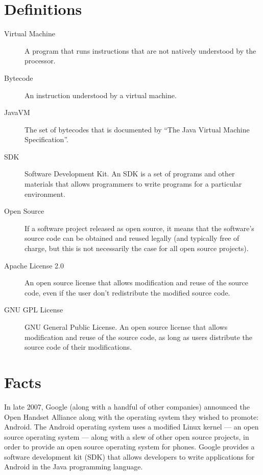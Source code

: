 \documentclass[11pt]{article}
\begin{document}
\newpage

\begin{multicols}{2}
\setcounter{page}{1}

\section{Definitions} %
\label{sec:defs}

\begin{description}
    \item[Virtual Machine] A program that runs instructions that are not
    natively understood by the processor.
    \item[Bytecode] An instruction understood by a virtual machine.
    \item[JavaVM] The set of bytecodes that is documented by ``The Java Virtual
    Machine Specification''. \cite{javavm-bytecode}
    \item[SDK] Software Development Kit.  An SDK is a set of programs and other
    materials that allows programmers to write programs for a particular
    environment.
    \item[Open Source] If a software project released as open source, it means
    that the software's source code can be obtained and reused legally (and
    typically free of charge, but this is not necessarily the case for all open
    source projects).
    \item[Apache License 2.0] An open source license that allows modification
    and reuse of the source code, even if the user don't redistribute the
    modified source code. \cite{apache-license}
    \item[GNU GPL License] GNU General Public License.  An open source license
    that allows modification and reuse of the source code, as long as users
    distribute the source code of their modifications. \cite{gpl-license}
\end{description}


\section{Facts} %
\label{sec:facts}

In late 2007, Google (along with a handful of other companies) announced the
Open Handset Alliance \cite{open-handset-alliance-ann} along with the operating
system they wished to promote: Android.  The Android operating system uses a
modified Linux kernel --- an open source operating system --- along with a slew
of other open source projects, in order to provide an open source operating
system for phones.  Google provides a software development kit (SDK) that allows
developers to write applications for Android in the Java programming language.


\end{multicols}
\end{document}
